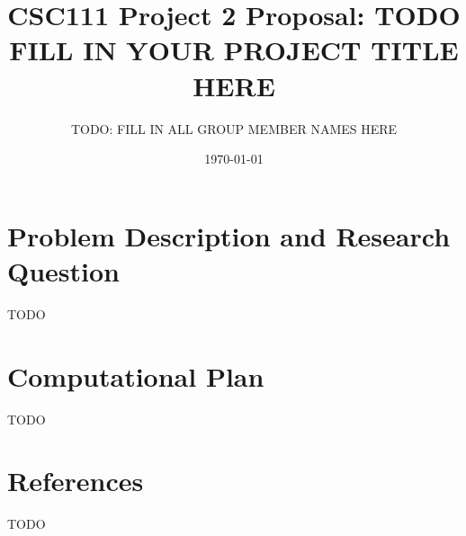 \documentclass[fontsize=11pt]{article}
\title{CSC111 Project 2 Proposal: TODO FILL IN YOUR PROJECT TITLE HERE}
\author{TODO: FILL IN ALL GROUP MEMBER NAMES HERE}
\date{\today}
\begin{document}
\maketitle

\section*{Problem Description and Research Question}

TODO

\section*{Computational Plan}

TODO

\section*{References}

TODO

\end{document}
